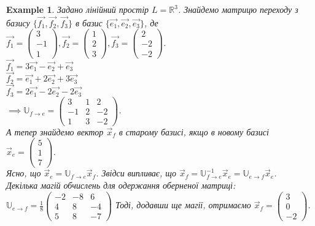 \documentclass[a4paper, 10pt]{article}
\def\huge{\displaystyle}
\theoremstyle{theoremdd}
\theoremstyle{theoremdd}
\theoremstyle{theoremdd}
\theoremstyle{theoremdd}
\newtheorem{example}[theorem]{Example}
\theoremstyle{theoremdd}
\theoremstyle{theoremdd}
\theoremstyle{theoremdd}
\theoremstyle{theoremdd}
\begin{document}
\begin{example} Задано лінійний простір $L = \mathbb{R}^3$. Знайдемо матрицю переходу з базису $\{\vec{f_1},\vec{f_2},\vec{f_3}\}$ в базис $\{\vec{e_1},\vec{e_2}, \vec{e_3}\}$, де\\
$\vec{f_1} = \begin{pmatrix}
3 \\ -1 \\ 1
\end{pmatrix}, \vec{f_2} = \begin{pmatrix}
1 \\ 2 \\ 3
\end{pmatrix}, \vec{f_3} = \begin{pmatrix}
2 \\ -2 \\ -2
\end{pmatrix}$.\\
$\vec{f_1} = 3\vec{e_1} -\vec{e_2} + \vec{e_3}$\\
$\vec{f_2} = \vec{e_1} +2\vec{e_2} + 3\vec{e_3}$\\
$\vec{f_3} = 2\vec{e_1} -2\vec{e_2} -2\vec{e_3}$\\
$\implies \mathbb{U}_{f \to e} = \begin{pmatrix}
3 & 1 & 2 \\
-1 & 2 & -2 \\
1 & 3 & -2
\end{pmatrix}$.
\bigskip \\
А тепер знайдемо вектор $\vec{x}_f$ в старому базисі, якщо в новому базисі $\vec{x}_e = \begin{pmatrix}
 5 \\ 1 \\ 7
\end{pmatrix}$.\\
Ясно, що $\vec{x}_e = \mathbb{U}_{f \to e}\vec{x}_f$. Звідси випливає, що $\vec{x}_f = \mathbb{U}^{-1}_{f \to e} \vec{x}_e = \mathbb{U}_{e \to f} \vec{x}_e$.\\
Декілька магій обчислень для одержання оберненої матриці:\\
$\mathbb{U}_{e \to f} = \huge \frac{1}{8} \begin{pmatrix}
-2 & -8 & 6 \\
4 & 8 & -4 \\
5 & 8 & -7
\end{pmatrix}$
Тоді, додавши ще магії, отримаємо $\vec{x}_f = \begin{pmatrix}
3 \\ 0 \\ -2
\end{pmatrix}$.
\end{example}
\end{document}
